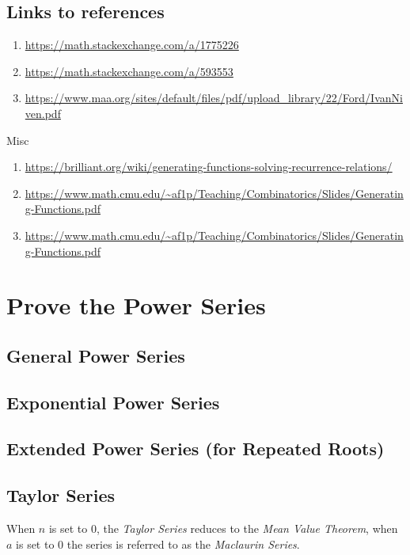 \documentclass[11pt]{article}
\begin{document}
\subsection{Links to references}
\label{sec:org888beae}

\begin{enumerate}
\item \url{https://math.stackexchange.com/a/1775226}
\item \url{https://math.stackexchange.com/a/593553}
\item \url{https://www.maa.org/sites/default/files/pdf/upload\_library/22/Ford/IvanNiven.pdf}
\end{enumerate}

Misc

\begin{enumerate}
\item \url{https://brilliant.org/wiki/generating-functions-solving-recurrence-relations/}
\item \url{https://www.math.cmu.edu/\~af1p/Teaching/Combinatorics/Slides/Generating-Functions.pdf}
\item \url{https://www.math.cmu.edu/\~af1p/Teaching/Combinatorics/Slides/Generating-Functions.pdf}
\end{enumerate}

\section{Prove the Power Series}
\label{sec:org0a544af}
\subsection{General Power Series}
\label{sec:orgd7043b2}

\subsection{Exponential Power Series}
\label{sec:orgcb7b0a9}
\subsection{Extended Power Series (for Repeated Roots)}
\label{sec:orgf5900a9}

\subsection{Taylor Series}
\label{sec:org062633b}


When \(n\) is set to 0, the \emph{Taylor Series} reduces to the \emph{Mean Value Theorem}, when \(a\) is set to 0 the series is referred to as the \emph{Maclaurin Series}.
\end{document}
